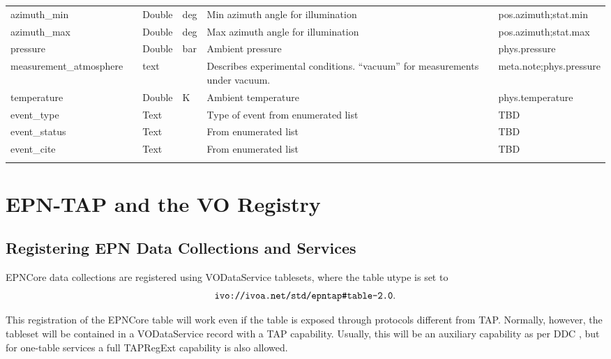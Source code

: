 \documentclass[11pt,a4paper]{ivoa}
\begin{document}
\begin{longtable}{p{3.5cm}p{0.5cm}p{1cm}p{1cm}p{7cm}p{3cm}}
azimuth\_min&&Double&deg&Min azimuth angle for illumination&pos.azimuth;stat.min\\

azimuth\_max&&Double&deg&Max azimuth angle for illumination&pos.azimuth;stat.max\\

pressure&&Double&bar&Ambient pressure&phys.pressure\\

measurement\_atmosphere&&text&&Describes experimental conditions. ``vacuum'' for measurements under vacuum.&meta.note;phys.pressure\\

temperature&&Double&K&Ambient temperature&phys.temperature\\

event\_type&&Text&&Type of event from enumerated list&TBD\\

event\_status&&Text&&From enumerated list&TBD\\

event\_cite&&Text&&From enumerated list&TBD\\

\sptablerule

\end{longtable}

\endgroup



\section{EPN-TAP and the VO Registry}

\subsection{Registering EPN Data Collections and Services}

EPNCore data collections are registered using VODataService
\citep{2010ivoa.spec.1202P} tablesets, where the table utype is set to
$$\hbox{\verb|ivo://ivoa.net/std/epntap#table-2.0|}.$$

This registration of the EPNCore table will work even if the table is
exposed through protocols different from TAP.  Normally, however, the
tableset will be contained in a VODataService 
record with a TAP capability.  Usually, this will be an auxiliary
capability as per DDC \citep{2019ivoa.rept.0520D}, but for one-table
services a full TAPRegExt \citep{2012ivoa.spec.0827D} capability is also
allowed.
\end{document}
